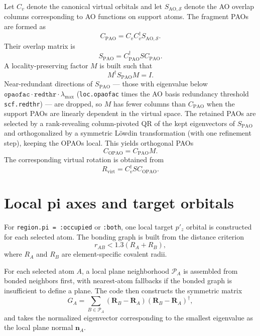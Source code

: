 \documentclass[a4paper,12pt,oneside]{book}
\newcommand{\vect}{\mathbf}
\newcommand{\cmd}[1]{\texttt{#1}}
\begin{document}
Let $C_v$ denote the canonical virtual orbitals and let $S_{\mathrm{AO},\mathcal{S}}$ denote the AO overlap columns corresponding to AO functions on support atoms.
The fragment PAOs are formed as
\begin{equation}
  C_{\mathrm{PAO}} = C_v C_v^\dagger S_{\mathrm{AO},\mathcal{S}}.
\end{equation}
Their overlap matrix is
\begin{equation}
  S_{\mathrm{PAO}} = C_{\mathrm{PAO}}^\dagger S C_{\mathrm{PAO}}.
\end{equation}
A locality-preserving factor $M$ is built such that
\begin{equation}
  M^\dagger S_{\mathrm{PAO}} M = I.
\end{equation}
Near-redundant directions of $S_{\mathrm{PAO}}$ --- those with eigenvalue below
$\mathtt{opaofac}\cdot\mathtt{redthr}\cdot\lambda_{\max}$ (\cmd{loc.opaofac} times the AO basis
redundancy threshold \cmd{scf.redthr}) --- are dropped, so $M$ has fewer columns than
$C_{\mathrm{PAO}}$ when the support PAOs are linearly dependent in the virtual space. The retained
PAOs are selected by a rank-revealing column-pivoted QR of the kept eigenvectors of
$S_{\mathrm{PAO}}$ and orthogonalized by a symmetric L\"owdin transformation (with one refinement
step), keeping the OPAOs local. This yields orthogonal PAOs
\begin{equation}
  C_{\mathrm{OPAO}} = C_{\mathrm{PAO}} M.
\end{equation}
The corresponding virtual rotation is obtained from
\begin{equation}
  R_{\mathrm{virt}} = C_v^\dagger S C_{\mathrm{OPAO}}.
\end{equation}

\section{Local pi axes and target orbitals}

For \cmd{region.pi = :occupied} or \cmd{:both}, one local target $p'_z$ orbital is constructed for each selected atom.
The bonding graph is built from the distance criterion
\begin{equation}
  r_{AB} \lt 1.3\left(R_A + R_B\right),
\end{equation}
where $R_A$ and $R_B$ are element-specific covalent radii.

For each selected atom $A$, a local plane neighborhood $\mathcal{P}_A$ is assembled from bonded neighbors first, with nearest-atom fallbacks if the bonded graph is insufficient to define a plane.
The code then constructs the symmetric matrix
\begin{equation}
  G_A = \sum_{B \in \mathcal{P}_A} \left(\vect{R}_B - \vect{R}_A\right)\left(\vect{R}_B - \vect{R}_A\right)^\dagger,
\end{equation}
and takes the normalized eigenvector corresponding to the smallest eigenvalue as the local plane normal $\vect{n}_A$.
\end{document}

